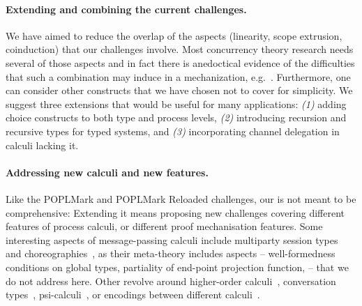 \documentclass[runningheads]{llncs}
\begin{document}
\paragraph{Extending and combining the current challenges.}
We have aimed to reduce the overlap of the aspects (linearity, scope
extrusion, coinduction) that our challenges involve.  Most concurrency
theory research needs several of those aspects and in fact there is
anedoctical evidence of the difficulties that such a combination may induce
in a mechanization,
e.g.~\cite{DBLP:conf/forte/ZalakainD21}. Furthermore, one can consider
other constructs that we have chosen not to cover for simplicity.  We
suggest three extensions that would be useful for many applications:
\emph{(1)} adding choice constructs to both type and process levels,
\emph{(2)} introducing recursion and recursive types for typed
systems, and \emph{(3)} incorporating channel delegation in calculi
lacking it.


\paragraph{Addressing new calculi and new features.}


Like the POPLMark and POPLMark Reloaded challenges, our %
is
not meant to be comprehensive: Extending it means proposing new
challenges covering different features of process calculi, or
different proof mechanisation features.  Some interesting aspects of
message-passing calculi %
include
multiparty session types~\cite{10.1145/2827695} and
choreographies~\cite{Carbone2013}, as their meta-theory includes
aspects -- \eg well-formedness conditions on global types, partiality
of end-point projection function, \etc -- that we do not address
here. Other revolve around higher-order calculi~\cite{Hirsch2022},
conversation types~\cite{DBLP:journals/tcs/CairesV10},
psi-calculi~\cite{lmcs:696}, or encodings between different
calculi~\cite{DBLP:journals/iandc/Gorla10,
  DBLP:conf/ecoop/ScalasDHY17}.
\end{document}
